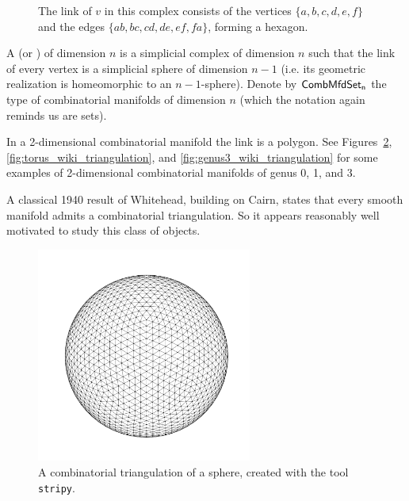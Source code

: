 \begin{figure}[htbp]
\centering
{}
\caption{The link of \( v \) in this complex consists of the vertices \( \{a,b,c,d,e,f\} \) and the edges \( \{ab,bc,cd,de,ef,fa\} \), forming a hexagon.}
\label{fig:link}
\end{figure}

\begin{mydef}
A  (or ) of dimension \( n \) is a simplicial complex of dimension \( n \) such that the link of every vertex is a simplicial sphere of dimension \( n-1 \) (i.e. its geometric realization is homeomorphic to an \( n-1 \)-sphere). Denote by \( \mathsf{CombMfdSet_n} \) the type of combinatorial manifolds of dimension \( n \) (which the notation again reminds us are sets).
\end{mydef}

In a 2-dimensional combinatorial manifold the link is a polygon. See Figures~\ref{fig:sphere_triangulation}, \ref{fig:torus_wiki_triangulation}, and \ref{fig:genus3_wiki_triangulation} for some examples of 2-dimensional combinatorial manifolds of genus 0, 1, and 3.

A classical 1940 result of Whitehead, building on Cairn, states that every smooth manifold admits a combinatorial triangulation\cite{whitehead_triangulation}. So it appears reasonably well motivated to study this class of objects.

\begin{figure}[htbp]
\centering
\includegraphics[width=200pt]{triangulated_sphere.pdf}
\caption{A combinatorial triangulation of a sphere, created with the tool \texttt{stripy}.}
\label{fig:sphere_triangulation}
\end{figure}

